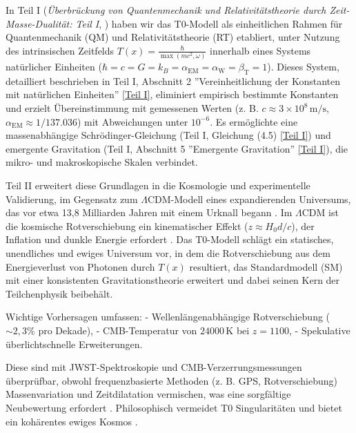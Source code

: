 \documentclass[12pt,a4paper]{article}
\newcommand{\Tfield}{T(x)}
\newcommand{\alphaEM}{\alpha_{\text{EM}}}
\newcommand{\alphaW}{\alpha_{\text{W}}}
\newcommand{\betaT}{\beta_{\text{T}}}
\begin{document}
	In Teil I (\textit{Überbrückung von Quantenmechanik und Relativitätstheorie durch Zeit-Masse-Dualität: Teil I}, \cite{pascher_part1_2025}) haben wir das T0-Modell als einheitlichen Rahmen für Quantenmechanik (QM) und Relativitätstheorie (RT) etabliert, unter Nutzung des intrinsischen Zeitfelds \(\Tfield = \frac{\hbar}{\max(mc^2, \omega)}\) innerhalb eines Systems natürlicher Einheiten (\(\hbar = c = G = k_B = \alphaEM = \alphaW = \betaT = 1\)). Dieses System, detailliert beschrieben in Teil I, Abschnitt 2 ''Vereinheitlichung der Konstanten mit natürlichen Einheiten'' \href{https://github.com/jpascher/T0-Time-Mass-Duality/tree/main/2/pdf/Deutsch/QMRelTimeMassPart1.pdf}{[Teil I]}, eliminiert empirisch bestimmte Konstanten und erzielt Übereinstimmung mit gemessenen Werten (z. B. \(c \approx 3 \times 10^8 \, \text{m/s}\), \(\alphaEM \approx 1/137.036\)) mit Abweichungen unter \(10^{-6}\). Es ermöglichte eine massenabhängige Schrödinger-Gleichung (Teil I, Gleichung (4.5) \href{https://github.com/jpascher/T0-Time-Mass-Duality/tree/main/2/pdf/Deutsch/QMRelTimeMassPart1.pdf}{[Teil I]}) und emergente Gravitation (Teil I, Abschnitt 5 ''Emergente Gravitation'' \href{https://github.com/jpascher/T0-Time-Mass-Duality/tree/main/2/pdf/Deutsch/QMRelTimeMassPart1.pdf}{[Teil I]}), die mikro- und makroskopische Skalen verbindet.
	
	Teil II erweitert diese Grundlagen in die Kosmologie und experimentelle Validierung, im Gegensatz zum \(\Lambda\)CDM-Modell eines expandierenden Universums, das vor etwa 13,8 Milliarden Jahren mit einem Urknall begann \cite{Planck2020}. Im \(\Lambda\)CDM ist die kosmische Rotverschiebung ein kinematischer Effekt (\(z \approx H_0 d / c\)), der Inflation und dunkle Energie erfordert \cite{Riess1998,Perlmutter1999}. Das T0-Modell schlägt ein statisches, unendliches und ewiges Universum vor, in dem die Rotverschiebung aus dem Energieverlust von Photonen durch \(\Tfield\) resultiert, das Standardmodell (SM) mit einer konsistenten Gravitationstheorie erweitert und dabei seinen Kern der Teilchenphysik beibehält.
	
	Wichtige Vorhersagen umfassen:
	- Wellenlängenabhängige Rotverschiebung (\(\sim 2,3\%\) pro Dekade),
	- CMB-Temperatur von \(24000 \, \text{K}\) bei \(z = 1100\),
	- Spekulative überlichtschnelle Erweiterungen.
	
	Diese sind mit JWST-Spektroskopie und CMB-Verzerrungsmessungen überprüfbar, obwohl frequenzbasierte Methoden (z. B. GPS, Rotverschiebung) Massenvariation und Zeitdilatation vermischen, was eine sorgfältige Neubewertung erfordert \cite{pascher_quantum_2025}. Philosophisch vermeidet T0 Singularitäten und bietet ein kohärentes ewiges Kosmos \cite{pascher_perspective_2025}.
	
\end{document}
